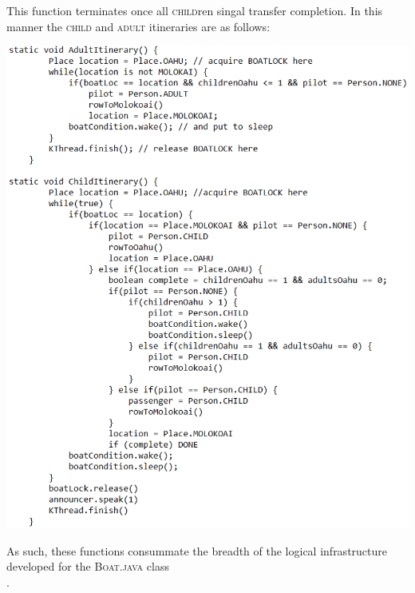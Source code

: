 \documentclass[12pt]{article}
\begin{document}
{This function terminates once all \textsc{child}ren singal transfer completion. In this manner the \textsc{child} and \textsc{adult} itineraries are as follows: 
\begin{center} \includegraphics[width=150mm]{pic10.png} \end{center} As such, these functions consummate the breadth of the logical infrastructure developed for the \textsc{Boat.java} class\\.
}
\end{document}
